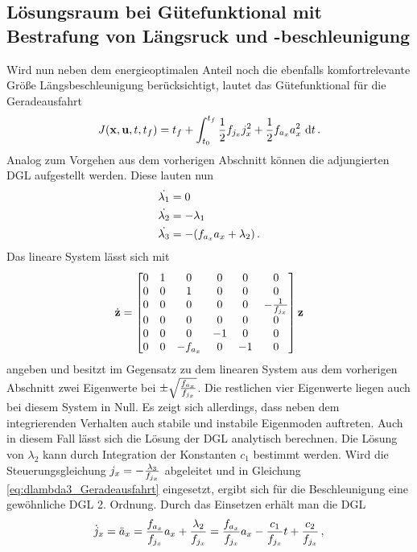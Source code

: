 \subsection{Lösungsraum bei Gütefunktional mit Bestrafung von Längsruck und -beschleunigung}\label{subsec:Lösungsraum_ax_jx}
Wird nun neben dem energieoptimalen Anteil noch die ebenfalls komfortrelevante Größe Längsbeschleunigung berücksichtigt, lautet das Gütefunktional für die Geradeausfahrt 
\begin{equation}
J(\boldsymbol{\mathrm{x}},\boldsymbol{\mathrm{u}},t,t_f) = t_f + \int_{t_0}^{t_f}\frac{1}{2}f_{j_x} j_x^2 + \frac{1}{2}f_{a_x} a_x^2~\textrm{d}{t}\,.
\end{equation}
Analog zum Vorgehen aus dem vorherigen Abschnitt können die adjungierten \gls{DGL} aufgestellt werden. Diese lauten nun
\begin{align}
\dot{\lambda_1} &= 0 \\
\dot{\lambda_2} &= -\lambda_1 \\
\dot{\lambda_3} &= -(f_{a_x} a_x + \lambda_2)\,. \label{eq:dlambda3_Geradeausfahrt}
\end{align}
Das lineare System lässt sich mit \begin{equation}
\dot{\boldsymbol{\mathrm{z}}} = \begin{bmatrix}
0 & 1 & 0 & 0 & 0 & 0 \\
0 & 0 & 1 & 0 & 0 & 0 \\
0 & 0 & 0 & 0 & 0 & -\frac{1}{f_{j_x}} \\
0 & 0 & 0 & 0 & 0 & 0 \\
0 & 0 & 0 & -1 & 0 & 0 \\
0 & 0 & -f_{a_x} & 0 & -1 & 0 \\
\end{bmatrix}\boldsymbol{\mathrm{z}}
\end{equation}
angeben und besitzt im Gegensatz zu dem linearen System aus dem vorherigen Abschnitt zwei Eigenwerte bei $\pm\sqrt{\frac{f_{a_x}}{f_{j_x}}}$. Die restlichen vier Eigenwerte liegen auch bei diesem System in Null. Es zeigt sich allerdings, dass neben dem integrierenden Verhalten auch stabile und instabile Eigenmoden auftreten. Auch in diesem Fall lässt sich die Lösung der \gls{DGL} analytisch berechnen. Die Lösung von $\lambda_2$ kann durch Integration der Konstanten $c_1$ bestimmt werden. Wird die Steuerungsgleichung $j_x = -\frac{\lambda_3}{f_{j_x}}$ abgeleitet und in Gleichung \eqref{eq:dlambda3_Geradeausfahrt} eingesetzt, ergibt sich für die Beschleunigung eine gewöhnliche \gls{DGL} 2. Ordnung. Durch das Einsetzen erhält man die \gls{DGL}
\begin{equation}
\dot{j}_x = \ddot{a}_x = \frac{f_{a_x}}{f_{j_x}}a_x + \frac{\lambda_2}{f_{j_x}} = \frac{f_{a_x}}{f_{j_x}}a_x - \frac{c_1}{f_{j_x}}t + \frac{c_2}{f_{j_x}} \,, \label{eq:DGL_ax}
\end{equation}

